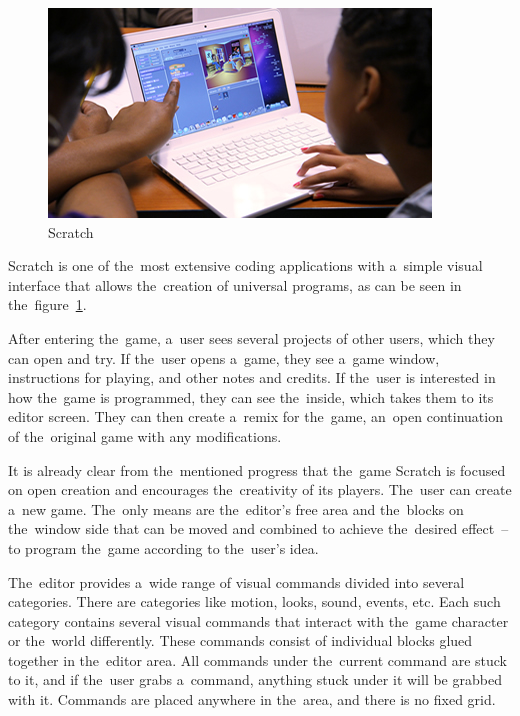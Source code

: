 \begin{figure}
    \centering
    \includegraphics[width=1\linewidth]{assets/similar-games/scratch.jpg}
    \caption{Scratch~\cite{a2022_scratch}}
    \label{fig:scratch}
\end{figure}

Scratch is one of the~most extensive coding applications with a~simple visual interface that allows the~creation of universal programs, as can be seen in the~figure~\ref{fig:scratch}.

After entering the~game, a~user sees several projects of other users, which they can open and try.
If the~user opens a~game, they see a~game window, instructions for playing, and other notes and credits.
If the~user is interested in how the~game is programmed, they can see the~inside, which takes them to its editor screen.
They can then create a~remix for the~game, an~open continuation of the~original game with any modifications.

It is already clear from the~mentioned progress that the~game Scratch is focused on open creation and encourages the~creativity of its players.
The~user can create a~new game.
The~only means are the~editor's free area and the~blocks on the~window side that can be moved and combined to achieve the~desired effect~-- to program the~game according to the~user's idea.

The~editor provides a~wide range of visual commands divided into several categories.
There are categories like motion, looks, sound, events, etc.
Each such category contains several visual commands that interact with the~game character or the~world differently.
These commands consist of individual blocks glued together in the~editor area.
All commands under the~current command are stuck to it, and if the~user grabs a~command, anything stuck under it will be grabbed with it.
Commands are placed anywhere in the~area, and there is no fixed grid.

